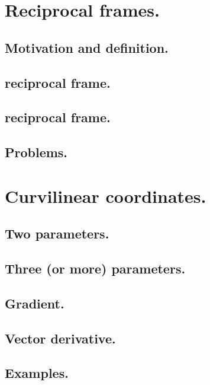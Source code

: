 %
%
   \section{Reciprocal frames.}
      \subsection{Motivation and definition.}
         
         
      \subsection{ reciprocal frame.}
         
      \subsection{ reciprocal frame.}
         
      \subsection{Problems.}
         
         
   \section{Curvilinear coordinates.}
      \subsection{Two parameters.}
         
      \subsection{Three (or more) parameters.}
         
      \subsection{Gradient.}
         
      \subsection{Vector derivative.}
         
      \subsection{Examples.}
         
